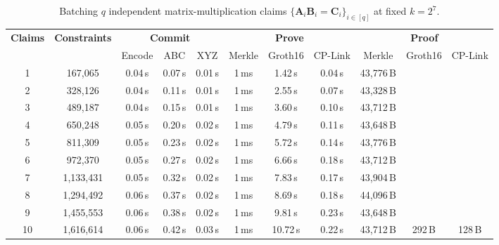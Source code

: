 \documentclass[conference,compsoc]{IEEEtran}
\newif\ifshowrevisions
\newcommand{\mat}{\mathbf}          %
\theoremstyle{plain}
\theoremstyle{definition}
\theoremstyle{remark}
\begin{document}
\begin{table}[!t]
\color{DiffBlue}
\centering
  \ifshowrevisions
    \rowcolors{1}{yellow!20}{yellow!20}
  \fi
\setlength{\tabcolsep}{2.4pt}
\begin{adjustbox}{max width=\textwidth}
\begin{tabular}{c c ccc ccc ccc}
\toprule
\multirow{2}{*}{\textbf{Claims}}
& \multirow{2}{*}{\textbf{Constraints}}
& \multicolumn{3}{c}{\textbf{Commit}}
& \multicolumn{3}{c}{\textbf{Prove}}
& \multicolumn{3}{c}{\textbf{Proof}} \\
\cmidrule(lr){3-5}\cmidrule(lr){6-8}\cmidrule(lr){9-11}
& & Encode & ABC & XYZ
& Merkle & Groth16 & CP-Link
& Merkle & Groth16 & CP-Link \\
\midrule
1  & 167{,}065   & 0.04\,s & 0.07\,s & 0.01\,s & 1\,ms & 1.42\,s  & 0.04\,s & 43{,}776\,B & & \\
2  & 328{,}126   & 0.04\,s & 0.11\,s & 0.01\,s & 1\,ms & 2.55\,s  & 0.07\,s & 43{,}328\,B & & \\
3  & 489{,}187   & 0.04\,s & 0.15\,s & 0.01\,s & 1\,ms & 3.60\,s  & 0.10\,s & 43{,}712\,B & & \\
4  & 650{,}248   & 0.05\,s & 0.20\,s & 0.02\,s & 1\,ms & 4.79\,s  & 0.11\,s & 43{,}648\,B & & \\
5  & 811{,}309   & 0.05\,s & 0.23\,s & 0.02\,s & 1\,ms & 5.72\,s  & 0.14\,s & 43{,}776\,B & & \\
6  & 972{,}370   & 0.05\,s & 0.27\,s & 0.02\,s & 1\,ms & 6.66\,s  & 0.18\,s & 43{,}712\,B & & \\
7  & 1{,}133{,}431 & 0.05\,s & 0.32\,s & 0.02\,s & 1\,ms & 7.83\,s  & 0.17\,s & 43{,}904\,B & & \\
8  & 1{,}294{,}492 & 0.06\,s & 0.37\,s & 0.02\,s & 1\,ms & 8.69\,s  & 0.18\,s & 44{,}096\,B & & \\
9  & 1{,}455{,}553 & 0.06\,s & 0.38\,s & 0.02\,s & 1\,ms & 9.81\,s  & 0.23\,s & 43{,}648\,B & & \\
10 & 1{,}616{,}614 & 0.06\,s & 0.42\,s & 0.03\,s & 1\,ms & 10.72\,s & 0.22\,s & 43{,}712\,B & \multirow{-10}{*}{292\,B} & \multirow{-10}{*}{128\,B} \\
\bottomrule
\end{tabular}
\end{adjustbox}
\vspace{6pt}
\caption{Batching \(q\) independent matrix-multiplication claims
\(\{\mat{A}_i\mat{B}_i=\mat{C}_i\}_{i\in[q]}\) at fixed \(k=2^7\).}
\label{tab:lamp-batch}
\end{table}
\end{document}
